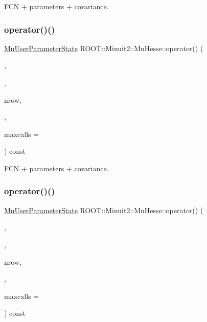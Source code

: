 F\+CN + parameters + covariance. 

\mbox{\label{classROOT_1_1Minuit2_1_1MnHesse_aa02f8d7bd10ea245658c9c1b3e296a45}} 
\subsubsection{\texorpdfstring{operator()()}{operator()()}\hspace{0.1cm}{\footnotesize\ttfamily [5/24]}}
{\footnotesize\ttfamily \mbox{\hyperlink{classROOT_1_1Minuit2_1_1MnUserParameterState}{Mn\+User\+Parameter\+State}} R\+O\+O\+T\+::\+Minuit2\+::\+Mn\+Hesse\+::operator() (\begin{DoxyParamCaption}\item[{const \mbox{\hyperlink{classROOT_1_1Minuit2_1_1FCNBase}{F\+C\+N\+Base}} \&}]{,  }\item[{const std\+::vector$<$ double $>$ \&}]{,  }\item[{unsigned int}]{nrow,  }\item[{const std\+::vector$<$ double $>$ \&}]{,  }\item[{unsigned int}]{maxcalls = {} }\end{DoxyParamCaption}) const}



F\+CN + parameters + covariance. 

\mbox{\label{classROOT_1_1Minuit2_1_1MnHesse_aa02f8d7bd10ea245658c9c1b3e296a45}} 
\subsubsection{\texorpdfstring{operator()()}{operator()()}\hspace{0.1cm}{\footnotesize\ttfamily [6/24]}}
{\footnotesize\ttfamily \mbox{\hyperlink{classROOT_1_1Minuit2_1_1MnUserParameterState}{Mn\+User\+Parameter\+State}} R\+O\+O\+T\+::\+Minuit2\+::\+Mn\+Hesse\+::operator() (\begin{DoxyParamCaption}\item[{const \mbox{\hyperlink{classROOT_1_1Minuit2_1_1FCNBase}{F\+C\+N\+Base}} \&}]{,  }\item[{const std\+::vector$<$ double $>$ \&}]{,  }\item[{unsigned int}]{nrow,  }\item[{const std\+::vector$<$ double $>$ \&}]{,  }\item[{unsigned int}]{maxcalls = {} }\end{DoxyParamCaption}) const}



